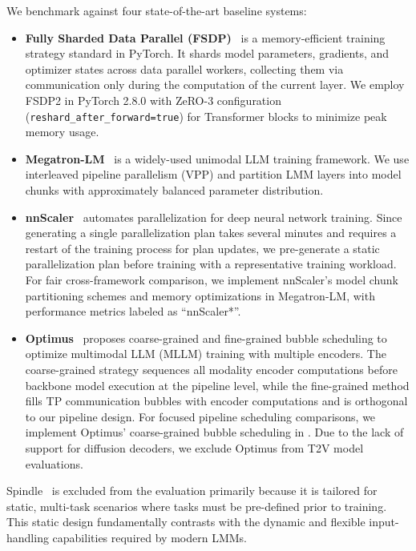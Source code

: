 We benchmark \sys{} against four state-of-the-art baseline systems:

\begin{itemize}
    \item \textbf{Fully Sharded Data Parallel (FSDP)}~\cite{fsdp-arxiv23} is a memory-efficient training strategy standard in PyTorch. It shards model parameters, gradients, and optimizer states across data parallel workers, collecting them via communication only during the computation of the current layer.
    We employ FSDP2 in PyTorch 2.8.0 with ZeRO-3 configuration (\texttt{reshard\_after\_forward=true}) for Transformer blocks to minimize peak memory usage.
    \item \textbf{Megatron-LM}~\cite{megatron-lm-arxiv20} is a widely-used unimodal LLM training framework.
    We use interleaved pipeline parallelism (VPP) and partition LMM layers into model chunks with approximately balanced parameter distribution.
    \item \textbf{nnScaler}~\cite{nnscaler-osdi24}
    automates parallelization for deep neural network training.
    Since generating a single parallelization plan takes several minutes and requires a restart of the training process for plan updates,
    we pre-generate a static parallelization plan before training with a representative training workload.
    For fair cross-framework comparison, we implement nnScaler's model chunk partitioning schemes and memory optimizations in Megatron-LM,
    with performance metrics labeled as ``nnScaler*''.
    \item \textbf{Optimus}~\cite{optimus-atc25}
    proposes coarse-grained and fine-grained bubble scheduling
    to optimize multimodal LLM (MLLM) training with multiple encoders.
    The coarse-grained strategy sequences all modality encoder computations before backbone model execution at the pipeline level,
    while the fine-grained method fills TP communication bubbles with encoder computations
    and is orthogonal to our pipeline design.
    For focused pipeline scheduling comparisons, we implement Optimus' coarse-grained bubble scheduling in \sys{}.
    Due to the lack of support for diffusion decoders, we exclude Optimus from T2V model evaluations.
\end{itemize}

Spindle~\cite{spindle-asplos25} is excluded from the evaluation primarily because it is tailored for static, multi-task scenarios where tasks must be pre-defined prior to training.
This static design fundamentally contrasts with the dynamic and flexible input-handling capabilities required by modern LMMs.

